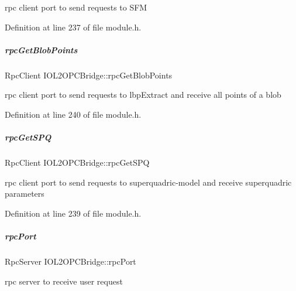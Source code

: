 rpc client port to send requests to S\+FM 



Definition at line 237 of file module.\+h.

\mbox{\label{group__iol2opc_a55365e238335fce2ec65e63885968926}} 
\subparagraph{\texorpdfstring{rpc\+Get\+Blob\+Points}{rpcGetBlobPoints}}
{\footnotesize\ttfamily Rpc\+Client I\+O\+L2\+O\+P\+C\+Bridge\+::rpc\+Get\+Blob\+Points\hspace{0.3cm}{\ttfamily [protected]}}



rpc client port to send requests to lbp\+Extract and receive all points of a blob 



Definition at line 240 of file module.\+h.

\mbox{\label{group__iol2opc_af7d4fdfb04c11e6b385bb69624765005}} 
\subparagraph{\texorpdfstring{rpc\+Get\+S\+PQ}{rpcGetSPQ}}
{\footnotesize\ttfamily Rpc\+Client I\+O\+L2\+O\+P\+C\+Bridge\+::rpc\+Get\+S\+PQ\hspace{0.3cm}{\ttfamily [protected]}}



rpc client port to send requests to superquadric-\/model and receive superquadric parameters 



Definition at line 239 of file module.\+h.

\mbox{\label{group__iol2opc_af1f97807672a82261e98cde725ac02ff}} 
\subparagraph{\texorpdfstring{rpc\+Port}{rpcPort}}
{\footnotesize\ttfamily Rpc\+Server I\+O\+L2\+O\+P\+C\+Bridge\+::rpc\+Port\hspace{0.3cm}{\ttfamily [protected]}}



rpc server to receive user request 



